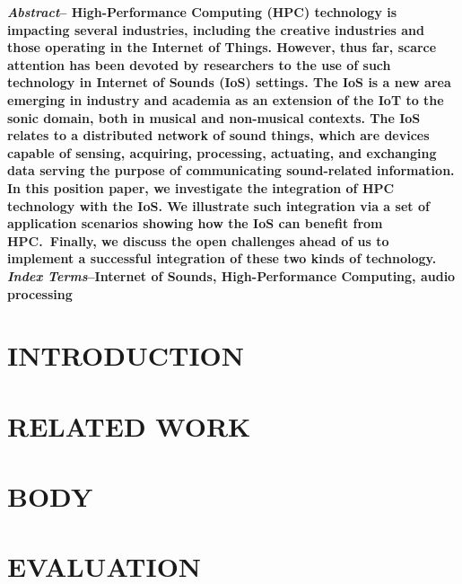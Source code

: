 \documentclass[12pt]{article}
\begin{document}
\begin{multicols}{2}

\textbf{\textit{Abstract}--
High-Performance Computing (HPC) technology is
impacting several industries, including the creative industries
and those operating in the Internet of Things. However, thus
far, scarce attention has been devoted by researchers to the use
of such technology in Internet of Sounds (IoS) settings. The
IoS is a new area emerging in industry and academia as an
extension of the IoT to the sonic domain, both in musical and
non-musical contexts. The IoS relates to a distributed network
of sound things, which are devices capable of sensing, acquiring,
processing, actuating, and exchanging data serving the purpose
of communicating sound-related information. In this position
paper, we investigate the integration of HPC technology with
the IoS. We illustrate such integration via a set of application
scenarios showing how the IoS can benefit from HPC.\ Finally, we
discuss the open challenges ahead of us to implement a successful
integration of these two kinds of technology. \\
\indent \textit{Index Terms}--Internet of Sounds, High-Performance
Computing, audio processing
}

\fontsize{9}{11}\selectfont  %

\begingroup\centering\section{INTRODUCTION}\endgroup

\blindtext\blindtext\blindtext


\begingroup\centering\section{RELATED WORK}\endgroup

\blindtext\blindtext\blindtext



\begingroup\centering\section{BODY}\endgroup

\blindtext\blindtext\blindtext



\begingroup\centering\section{EVALUATION}\endgroup


\end{multicols}
\end{document}
